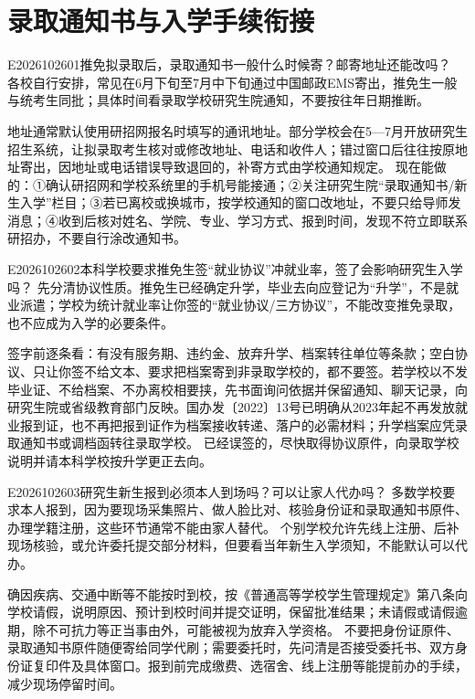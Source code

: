 \section{录取通知书与入学手续衔接}
\begin{qa}{E2026102601}{推免拟录取后，录取通知书一般什么时候寄？邮寄地址还能改吗？}
各校自行安排，常见在6月下旬至7月中下旬通过中国邮政EMS寄出，推免生一般与统考生同批；具体时间看录取学校研究生院通知，不要按往年日期推断。

地址通常默认使用研招网报名时填写的通讯地址。部分学校会在5—7月开放研究生招生系统，让拟录取考生核对或修改地址、电话和收件人；错过窗口后往往按原地址寄出，因地址或电话错误导致退回的，补寄方式由学校通知规定。 现在能做的：①确认研招网和学校系统里的手机号能接通；②关注研究生院“录取通知书/新生入学”栏目；③若已离校或换城市，按学校通知的窗口改地址，不要只给导师发消息；④收到后核对姓名、学院、专业、学习方式、报到时间，发现不符立即联系研招办，不要自行涂改通知书。
\end{qa}

\begin{qa}{E2026102602}{本科学校要求推免生签“就业协议”冲就业率，签了会影响研究生入学吗？}
先分清协议性质。推免生已经确定升学，毕业去向应登记为“升学”，不是就业派遣；学校为统计就业率让你签的“就业协议/三方协议”，不能改变推免录取，也不应成为入学的必要条件。

签字前逐条看：有没有服务期、违约金、放弃升学、档案转往单位等条款；空白协议、只让你签不给文本、要求把档案寄到非录取学校的，都不要签。若学校以不发毕业证、不给档案、不办离校相要挟，先书面询问依据并保留通知、聊天记录，向研究生院或省级教育部门反映。国办发〔2022〕13号已明确从2023年起不再发放就业报到证，也不再把报到证作为档案接收转递、落户的必需材料；升学档案应凭录取通知书或调档函转往录取学校。 已经误签的，尽快取得协议原件，向录取学校说明并请本科学校按升学更正去向。
\end{qa}

\begin{qa}{E2026102603}{研究生新生报到必须本人到场吗？可以让家人代办吗？}
多数学校要求本人报到，因为要现场采集照片、做人脸比对、核验身份证和录取通知书原件、办理学籍注册，这些环节通常不能由家人替代。 个别学校允许先线上注册、后补现场核验，或允许委托提交部分材料，但要看当年新生入学须知，不能默认可以代办。

确因疾病、交通中断等不能按时到校，按《普通高等学校学生管理规定》第八条向学校请假，说明原因、预计到校时间并提交证明，保留批准结果；未请假或请假逾期，除不可抗力等正当事由外，可能被视为放弃入学资格。 不要把身份证原件、录取通知书原件随便寄给同学代刷；需要委托时，先问清是否接受委托书、双方身份证复印件及具体窗口。报到前完成缴费、选宿舍、线上注册等能提前办的手续，减少现场停留时间。
 
\end{qa}

